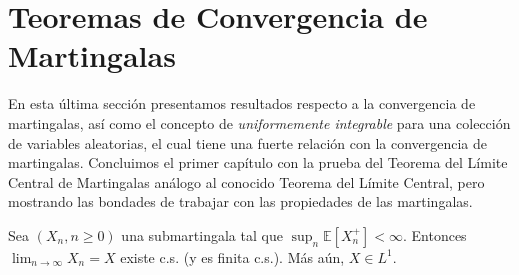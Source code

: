 \section{Teoremas de Convergencia de Martingalas}
En esta última sección presentamos resultados respecto a la convergencia de martingalas, así como el concepto de \emph{uniformemente integrable} para una colección de variables aleatorias, el cual tiene una fuerte relación con la convergencia de martingalas. Concluimos el primer capítulo con la prueba del Teorema del Límite Central de Martingalas análogo al conocido Teorema del Límite Central, pero mostrando las bondades de trabajar con las propiedades de las martingalas.

\begin{theorem}
\label{conver1}
Sea $(X_n, n \geq 0)$ una submartingala tal que $\sup_n \mathbb{E}[X_n^{+}] < \infty$. Entonces $\lim_{n \rightarrow \infty} X_n = X$ existe c.s. (y es finita c.s.). Más aún, $X \in L^1$.
\end{theorem}
